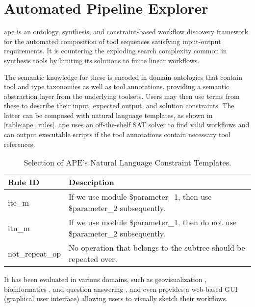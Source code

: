 \section{Automated Pipeline Explorer}

\acf{ape} \cite{kasalica2022synthesis} is an ontology, synthesis, and constraint-based workflow discovery framework for the automated composition of tool sequences satisfying input-output requirements. It is countering the exploding search complexity common in synthesis tools by limiting its solutions to finite linear workflows.

The semantic knowledge for these is encoded in domain ontologies that contain tool and type taxonomies as well as tool annotations, providing a semantic abstraction layer from the underlying toolsets. Users may then use terms from these to describe their input, expected output, and solution constraints. The latter can be composed with natural language templates, as shown in \autoref{table:ape_rules}. \ac{ape} uses an off-the-shelf SAT solver to find valid workflows and can output executable scripts if the tool annotations contain necessary tool references.

\begin{table}[ht]
\centering
\caption{Selection of APE's Natural Language Constraint Templates.}
\label{table:ape_rules}
\begin{tabularx}{\textwidth}{|l|X|}
\hline
\textbf{Rule ID} & \textbf{Description} \\
\hline
ite\_m & If we use module \${parameter\_1}, then use \${parameter\_2} subsequently. \\
\hline
itn\_m & If we use module \${parameter\_1}, then do not use \${parameter\_2} subsequently. \\
\hline
not\_repeat\_op & No operation that belongs to the subtree should be repeated over. \\
\hline
\end{tabularx}
\end{table}

It has been evaluated in various domains, such as geovisualization \cite{kasalica2019workflow}, bioinformatics \cite{kasalica2021ape}, and question answering \cite{kasalica2022synthesis}, and even provides a web-based GUI (graphical user interface) allowing users to visually sketch their workflows.

